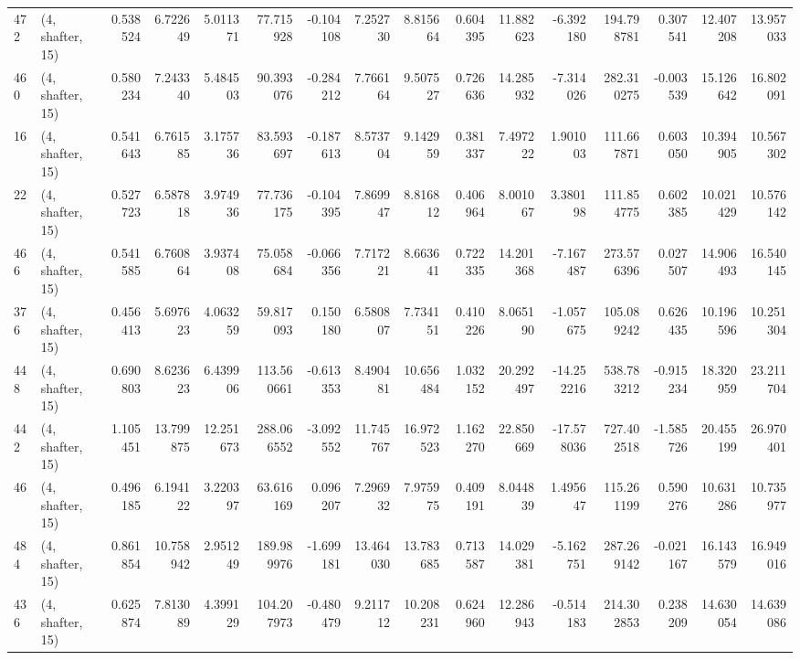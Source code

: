 \begin{tabular}{llrrrrrrrrrrrrrr}
472 &  (4, shafter, 15) &   0.538524 &   6.722649 &   5.011371 &    77.715928 &  -0.104108 &   7.252730 &   8.815664 &  0.604395 &  11.882623 &  -6.392180 &   194.798781 &  0.307541 &  12.407208 &  13.957033 \\
460 &  (4, shafter, 15) &   0.580234 &   7.243340 &   5.484503 &    90.393076 &  -0.284212 &   7.766164 &   9.507527 &  0.726636 &  14.285932 &  -7.314026 &   282.310275 & -0.003539 &  15.126642 &  16.802091 \\
16  &  (4, shafter, 15) &   0.541643 &   6.761585 &   3.175736 &    83.593697 &  -0.187613 &   8.573704 &   9.142959 &  0.381337 &   7.497222 &   1.901003 &   111.667871 &  0.603050 &  10.394905 &  10.567302 \\
22  &  (4, shafter, 15) &   0.527723 &   6.587818 &   3.974936 &    77.736175 &  -0.104395 &   7.869947 &   8.816812 &  0.406964 &   8.001067 &   3.380198 &   111.854775 &  0.602385 &  10.021429 &  10.576142 \\
466 &  (4, shafter, 15) &   0.541585 &   6.760864 &   3.937408 &    75.058684 &  -0.066356 &   7.717221 &   8.663641 &  0.722335 &  14.201368 &  -7.167487 &   273.576396 &  0.027507 &  14.906493 &  16.540145 \\
376 &  (4, shafter, 15) &   0.456413 &   5.697623 &   4.063259 &    59.817093 &   0.150180 &   6.580807 &   7.734151 &  0.410226 &   8.065190 &  -1.057675 &   105.089242 &  0.626435 &  10.196596 &  10.251304 \\
448 &  (4, shafter, 15) &   0.690803 &   8.623623 &   6.439906 &   113.560661 &  -0.613353 &   8.490481 &  10.656484 &  1.032152 &  20.292497 & -14.252216 &   538.783212 & -0.915234 &  18.320959 &  23.211704 \\
442 &  (4, shafter, 15) &   1.105451 &  13.799875 &  12.251673 &   288.066552 &  -3.092552 &  11.745767 &  16.972523 &  1.162270 &  22.850669 & -17.578036 &   727.402518 & -1.585726 &  20.455199 &  26.970401 \\
46  &  (4, shafter, 15) &   0.496185 &   6.194122 &   3.220397 &    63.616169 &   0.096207 &   7.296932 &   7.975975 &  0.409191 &   8.044839 &   1.495647 &   115.261199 &  0.590276 &  10.631286 &  10.735977 \\
484 &  (4, shafter, 15) &   0.861854 &  10.758942 &   2.951249 &   189.989976 &  -1.699181 &  13.464030 &  13.783685 &  0.713587 &  14.029381 &  -5.162751 &   287.269142 & -0.021167 &  16.143579 &  16.949016 \\
436 &  (4, shafter, 15) &   0.625874 &   7.813089 &   4.399129 &   104.207973 &  -0.480479 &   9.211712 &  10.208231 &  0.624960 &  12.286943 &  -0.514183 &   214.302853 &  0.238209 &  14.630054 &  14.639086 \\

\end{tabular}
